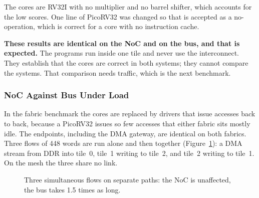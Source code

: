 \documentclass[11pt,a4paper]{article}
\newcommand{\code}[1]{\texttt{\detokenize{#1}}}
\begin{document}
The cores are RV32I with no multiplier and no barrel shifter, which accounts
for the low scores. One line of PicoRV32 was changed so that \code{fence.i}
is accepted as a no-operation, which is correct for a core with no
instruction cache.

\textbf{These results are identical on the NoC and on the bus, and that is
expected.} The programs run inside one tile and never use the interconnect.
They establish that the cores are correct in both systems; they cannot compare
the systems. That comparison needs traffic, which is the next benchmark.

\subsubsection{NoC Against Bus Under Load}
\label{sec:fabric}

In the fabric benchmark the cores are replaced by drivers that issue accesses
back to back, because a PicoRV32 issues so few accesses that either fabric
sits mostly idle. The endpoints, including the DMA gateway, are identical on
both fabrics. Three flows of 448 words are run alone and then together
(Figure~\ref{fig:fabric}): a DMA stream from DDR into tile~0, tile~1 writing
to tile~2, and tile~2 writing to tile~1. On the mesh the three share no link.

\begin{figure}[h]
\centering
{}
\caption{Three simultaneous flows on separate paths: the NoC is unaffected,
the bus takes 1.5 times as long.}
\label{fig:fabric}
\end{figure}
\end{document}

